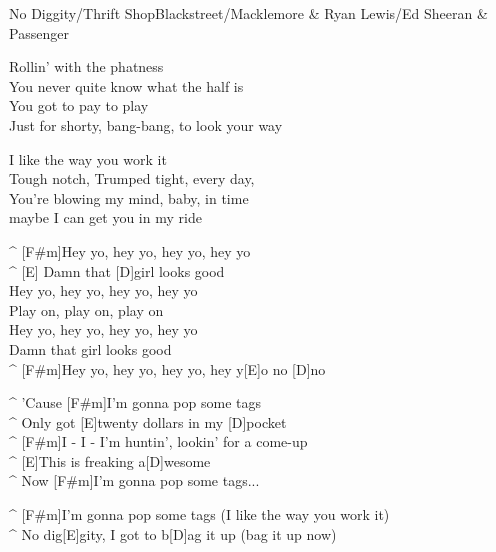 \begin{song}{No Diggity/Thrift Shop}{Blackstreet/Macklemore \& Ryan Lewis/Ed Sheeran \& Passenger}
\begin{guitar}
Rollin' with the phatness\\
You never quite know what the half is\\
You got to pay to play\\
Just for shorty, bang-bang, to look your way\\
\end{guitar}

\begin{guitar}
I like the way you work it\\
Tough notch, Trumped tight, every day,\\
You're blowing my mind, baby, in time\\
maybe I can get you in my ride\\
\end{guitar}


\begin{guitar}
^ [F#m]Hey yo, hey yo, hey yo, hey yo\\
^ [E] Damn that [D]girl looks good\\
Hey yo, hey yo, hey yo, hey yo\\
Play on, play on, play on\\
Hey yo, hey yo, hey yo, hey yo\\
Damn that girl looks good\\
^ [F#m]Hey yo, hey yo, hey yo, hey y[E]o no [D]no \\
\end{guitar}

\begin{guitar}
^ 'Cause [F#m]I'm gonna pop some tags\\
^ Only got [E]twenty dollars in my [D]pocket\\
^ [F#m]I - I - I'm huntin', lookin' for a come-up\\
^ [E]This is freaking a[D]wesome\\
^ Now [F#m]I'm gonna pop some tags...\\
\end{guitar}

\begin{guitar}
^ [F#m]I'm gonna pop some tags (I like the way you work it)\\
^ No dig[E]gity, I got to b[D]ag it up (bag it up now)\\
\end{guitar}

\end{song}
